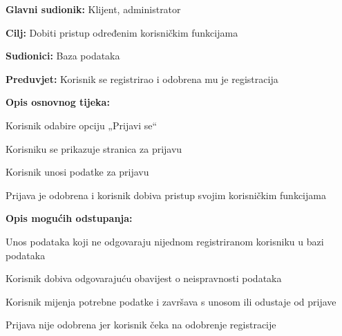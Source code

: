 						\noindent {}
						\begin{packed_item}
							
							\item \textbf{Glavni sudionik: } Klijent, administrator
							\item  \textbf{Cilj:} Dobiti pristup određenim korisničkim funkcijama
							\item  \textbf{Sudionici:} Baza podataka
							\item  \textbf{Preduvjet:} Korisnik se registrirao i odobrena mu je registracija
							\item  \textbf{Opis osnovnog tijeka:}
							
							\item[] \begin{packed_enum}
								
								\item 	Korisnik odabire opciju „Prijavi se“
								\item 	Korisniku se prikazuje stranica za prijavu
								\item 	Korisnik unosi podatke za prijavu
								\item 	Prijava je odobrena i korisnik dobiva pristup svojim korisničkim funkcijama
								
								
								
								
							\end{packed_enum}
							
							\item  \textbf{Opis mogućih odstupanja:}
							
							\item[] \begin{packed_item}
								
								\item[3.a] Unos podataka koji ne odgovaraju nijednom registriranom korisniku u bazi podataka
								\item[] \begin{packed_enum}
									
									\item Korisnik dobiva odgovarajuću obavijest o neispravnosti podataka
									\item Korisnik mijenja potrebne podatke i završava s unosom ili odustaje od prijave
									
									
								\end{packed_enum}
								\item[4.a] Prijava nije odobrena jer korisnik čeka na odobrenje registracije
								\item[] \begin{packed_enum}
									

\end{packed_enum}
\end{packed_item}
\end{packed_item}
